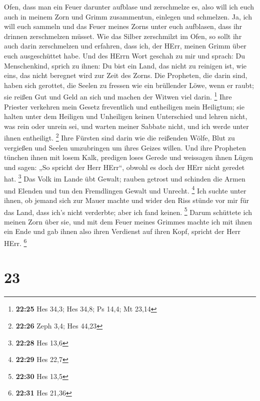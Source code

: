 Ofen, dass man ein Feuer darunter aufblase und zerschmelze es, also will
ich euch auch in meinem Zorn und Grimm zusammentun, einlegen und
schmelzen.  Ja, ich will euch sammeln und das Feuer meines
Zorns unter euch aufblasen, dass ihr drinnen zerschmelzen müsset.
 Wie das Silber zerschmilzt im Ofen, so sollt ihr auch
darin zerschmelzen und erfahren, dass ich, der HErr, meinen Grimm über
euch ausgeschüttet habe.  Und des HErrn Wort geschah zu mir
und sprach:  Du Menschenkind, sprich zu ihnen: Du bist ein
Land, das nicht zu reinigen ist, wie eins, das nicht beregnet wird zur
Zeit des Zorns.  Die Propheten, die darin sind, haben sich
gerottet, die Seelen zu fressen wie ein brüllender Löwe, wenn er raubt;
sie reißen Gut und Geld an sich und machen der Witwen viel darin.
\footnote{\textbf{22:25} Hes 34,3; Hes 34,8; Ps 14,4; Mt 23,14}
 Ihre Priester verkehren mein Gesetz freventlich und
entheiligen mein Heiligtum; sie halten unter dem Heiligen und Unheiligen
keinen Unterschied und lehren nicht, was rein oder unrein sei, und
warten meiner Sabbate nicht, und ich werde unter ihnen entheiligt.
\footnote{\textbf{22:26} Zeph 3,4; Hes 44,23}  Ihre Fürsten
sind darin wie die reißenden Wölfe, Blut zu vergießen und Seelen
umzubringen um ihres Geizes willen.  Und ihre Propheten
tünchen ihnen mit losem Kalk, predigen loses Gerede und weissagen ihnen
Lügen und sagen: „So spricht der Herr HErr``, obwohl es doch der HErr
nicht geredet hat. \footnote{\textbf{22:28} Hes 13,6}  Das
Volk im Lande übt Gewalt; rauben getrost und schinden die Armen und
Elenden und tun den Fremdlingen Gewalt und Unrecht. \footnote{\textbf{22:29}
  Hes 22,7}  Ich suchte unter ihnen, ob jemand sich zur
Mauer machte und wider den Riss stünde vor mir für das Land, dass ich's
nicht verderbte; aber ich fand keinen. \footnote{\textbf{22:30} Hes 13,5}
 Darum schüttete ich meinen Zorn über sie, und mit dem
Feuer meines Grimmes machte ich mit ihnen ein Ende und gab ihnen also
ihren Verdienst auf ihren Kopf, spricht der Herr HErr. \footnote{\textbf{22:31}
  Hes 21,36}

\hypertarget{section-7}{%
\section{23}\label{section-7}}

